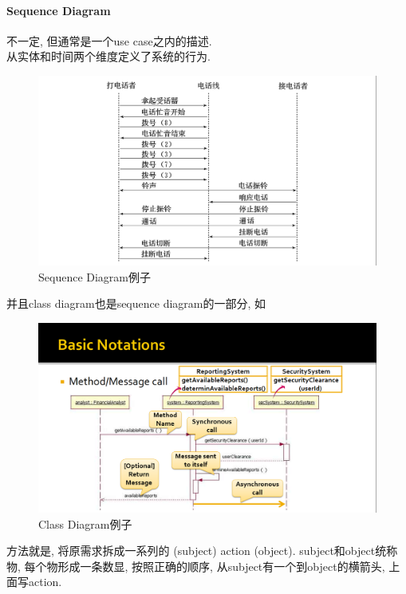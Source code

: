 \documentclass{ctexart}
\begin{document}
\paragraph{Sequence Diagram}
    不一定, 但通常是一个use case之内的描述.\\
    从实体和时间两个维度定义了系统的行为.\par
    \begin{figure}[ht!]
        \centering
        \includegraphics[width=\textwidth, height=\textheight, keepaspectratio]{seqdiag.png}
        \caption{Sequence Diagram例子}
    \end{figure}
    并且class diagram也是sequence diagram的一部分, 如
    \begin{figure}[ht!]
        \centering
        \includegraphics[width=\textwidth, height=\textheight, keepaspectratio]{seqdiag1.png}
        \caption{Class Diagram例子}
    \end{figure}
    方法就是, 将原需求拆成一系列的 (subject) {action} (object).
    subject和object统称物, 每个物形成一条数显, 按照正确的顺序,
    从subject有一个到object的横箭头, 上面写action.\par
\end{document}
